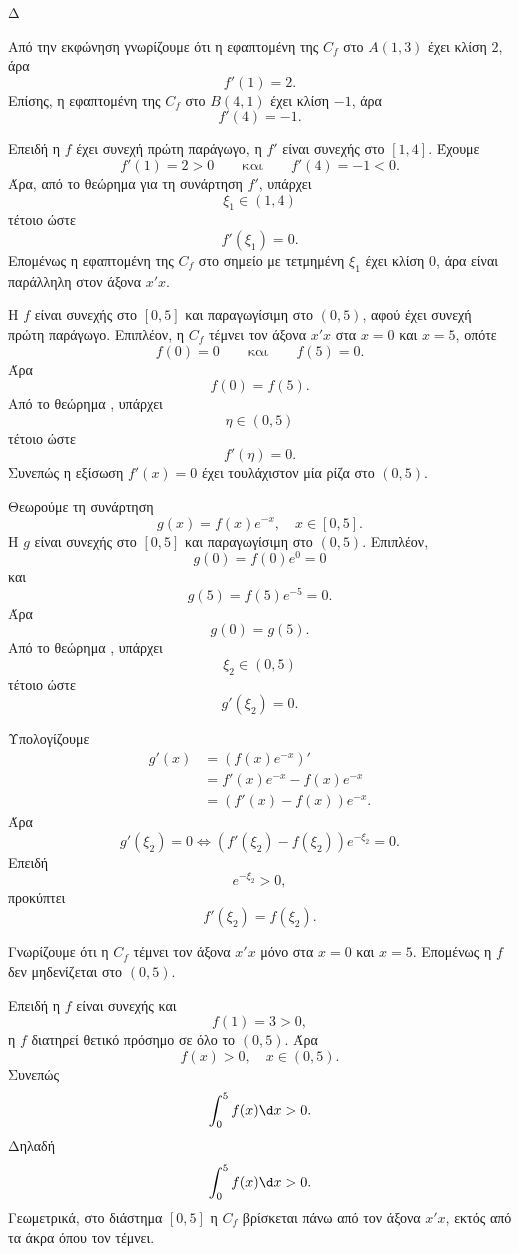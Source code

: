 \begin{thema}{Δ}
\begin{erwthma}
\item Από την εκφώνηση γνωρίζουμε ότι η εφαπτομένη της $C_f$ στο
$A(1,3)$ έχει κλίση $2$, άρα
\[
f'(1)=2.
\]
Επίσης, η εφαπτομένη της $C_f$ στο $B(4,1)$ έχει κλίση $-1$, άρα
\[
f'(4)=-1.
\]

Επειδή η $f$ έχει συνεχή πρώτη παράγωγο, η $f'$ είναι συνεχής στο
$[1,4]$. Έχουμε
\[
f'(1)=2>0
\qquad\text{και}\qquad
f'(4)=-1<0.
\]
Άρα, από το θεώρημα  για τη συνάρτηση $f'$, υπάρχει
\[
\xi_1\in(1,4)
\]
τέτοιο ώστε
\[
f'(\xi_1)=0.
\]
Επομένως η εφαπτομένη της $C_f$ στο σημείο με τετμημένη $\xi_1$ έχει
κλίση $0$, άρα είναι παράλληλη στον άξονα $x'x$.

\item Η $f$ είναι συνεχής στο $[0,5]$ και παραγωγίσιμη στο $(0,5)$,
αφού έχει συνεχή πρώτη παράγωγο. Επιπλέον, η $C_f$ τέμνει τον άξονα
$x'x$ στα $x=0$ και $x=5$, οπότε
\[
f(0)=0
\qquad\text{και}\qquad
f(5)=0.
\]
Άρα
\[
f(0)=f(5).
\]
Από το θεώρημα , υπάρχει
\[
\eta\in(0,5)
\]
τέτοιο ώστε
\[
{f'(\eta)=0}.
\]
Συνεπώς η εξίσωση $f'(x)=0$ έχει τουλάχιστον μία ρίζα στο $(0,5)$.

\item Θεωρούμε τη συνάρτηση
\[
g(x)=f(x)e^{-x},\quad x\in[0,5].
\]
Η $g$ είναι συνεχής στο $[0,5]$ και παραγωγίσιμη στο $(0,5)$.
Επιπλέον,
\[
g(0)=f(0)e^0=0
\]
και
\[
g(5)=f(5)e^{-5}=0.
\]
Άρα
\[
g(0)=g(5).
\]
Από το θεώρημα , υπάρχει
\[
\xi_2\in(0,5)
\]
τέτοιο ώστε
\[
g'(\xi_2)=0.
\]

Υπολογίζουμε
\begin{align*}
g'(x)
&=\left(f(x)e^{-x}\right)'\\
&=f'(x)e^{-x}-f(x)e^{-x}\\
&=\left(f'(x)-f(x)\right)e^{-x}.
\end{align*}
Άρα
\[
g'(\xi_2)=0
\Leftrightarrow
\left(f'(\xi_2)-f(\xi_2)\right)e^{-\xi_2}=0.
\]
Επειδή
\[
e^{-\xi_2}>0,
\]
προκύπτει
\[
{f'(\xi_2)=f(\xi_2)}.
\]

\item Γνωρίζουμε ότι η $C_f$ τέμνει τον άξονα $x'x$ μόνο στα $x=0$ και
$x=5$. Επομένως η $f$ δεν μηδενίζεται στο $(0,5)$.

Επειδή η $f$ είναι συνεχής και
\[
f(1)=3>0,
\]
η $f$ διατηρεί θετικό πρόσημο σε όλο το $(0,5)$. Άρα
\[
f(x)>0,\quad x\in(0,5).
\]
Συνεπώς
\[
\int_0^5 f(x)\d x>0.
\]
Δηλαδή
\[
{\int_0^5 f(x)\d x>0}.
\]
Γεωμετρικά, στο διάστημα $[0,5]$ η $C_f$ βρίσκεται πάνω από τον άξονα
$x'x$, εκτός από τα άκρα όπου τον τέμνει.
\end{erwthma}
\end{thema}

